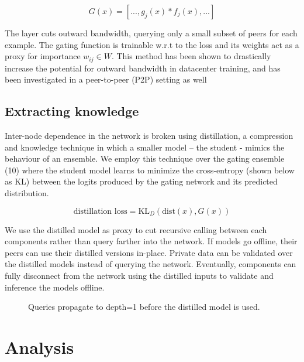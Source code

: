 \documentclass{article}
\begin{document}
\begin{equation}
G(x) = [ ..., g_j(x) * f_j(x), ...]
\end{equation}


The layer cuts outward bandwidth, querying only a small subset of peers for each example. The gating function is trainable w.r.t to the loss and its weights act as a proxy for importance $w_{ij} \in W$. This method has been shown to drastically increase the potential for outward bandwidth in datacenter training,\cite{shazeer2017outrageously} and has been investigated in a peer-to-peer (P2P) setting as well \cite{Riabinin2020learningathome}


\subsection{Extracting knowledge}

Inter-node dependence in the network is broken using distillation\cite{hinton2015distilling}, a compression and knowledge technique in which a smaller model -- the student - mimics the behaviour of an ensemble. We employ this technique over the gating ensemble (10) where the student model learns to minimize the cross-entropy (shown below as KL) between the logits produced by the gating network and its predicted distribution. \cite{Sanh2019DistilBERT}
\smallskip

\begin{equation}
\textrm{distillation loss} = \text{KL}_D(\text{dist}(x), G(x)) 
\end{equation}

We use the distilled model as proxy to cut recursive calling between each components rather than query farther into the network. If models go offline, their peers can use their distilled versions in-place. Private data can be validated over the distilled models instead of querying the network. Eventually, components can fully disconnect from the network using the distilled inputs to validate and inference the models offline.
\smallskip

\begin{figure}[H]
	\centering
	\hspace*{0cm}
	
	\caption{Queries propagate to depth=1 before the distilled model is used.}
\end{figure}{}

\section{Analysis}
\label{analysis}
\end{document}
